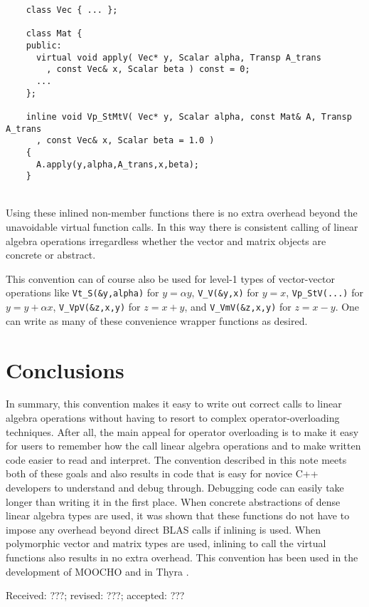 \documentclass[acmtoms,acmnow]{acmtrans2m}
\begin{document}
{\bsinglespace\small
\begin{minipage}{\textwidth}
\begin{verbatim}
    class Vec { ... };

    class Mat {
    public:
      virtual void apply( Vec* y, Scalar alpha, Transp A_trans
        , const Vec& x, Scalar beta ) const = 0;
      ...
    };

    inline void Vp_StMtV( Vec* y, Scalar alpha, const Mat& A, Transp A_trans
      , const Vec& x, Scalar beta = 1.0 )
    {
      A.apply(y,alpha,A_trans,x,beta);
    }
\end{verbatim}
\end{minipage}
\esinglespace}\\[1ex]

Using these inlined non-member functions there is no extra overhead beyond the
unavoidable virtual function calls.  In this way there is consistent calling
of linear algebra operations irregardless whether the vector and matrix
objects are concrete or abstract.

This convention can of course also be used for level-1 types of vector-vector
operations like {}\texttt{Vt\_S(\&y,alpha)} for $y = \alpha y$,
{}\texttt{V\_V(\&y,x)} for $y = x$, {}\texttt{Vp\_StV(...)} for $y = y +
\alpha x$, {}\texttt{V\_VpV(\&z,x,y)} for $z = x + y$, and
{}\texttt{V\_VmV(\&z,x,y)} for $z = x - y$.  One can write as many of these
convenience wrapper functions as desired.

\section{Conclusions}

In summary, this convention makes it easy to write out correct calls to linear
algebra operations without having to resort to complex operator-overloading
techniques.  After all, the main appeal for operator overloading is to make it
easy for users to remember how the call linear algebra operations and to make
written code easier to read and interpret.  The convention described in this
note meets both of these goals and also results in code that is easy for
novice C++ developers to understand and debug through.  Debugging code can
easily take longer than writing it in the first place.  When concrete
abstractions of dense linear algebra types are used, it was shown that these
functions do not have to impose any overhead beyond direct BLAS calls if
inlining is used.  When polymorphic vector and matrix types are used, inlining
to call the virtual functions also results in no extra overhead.  This
convention has been used in the development of MOOCHO {}\cite{ref:moocho} and
in Thyra {}\cite{ref:thyra}.

{\bsinglespace

\nopagebreak
\scriptsize

\esinglespace}

\begin{received}
Received: ???; revised: ???; accepted: ???
\end{received}
\end{document}
